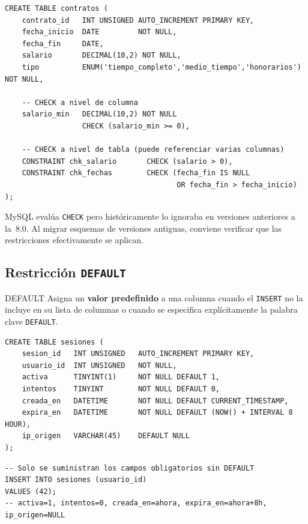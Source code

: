 \begin{lstlisting}[style=sql, caption={CHECK a nivel de columna y de tabla}]
CREATE TABLE contratos (
    contrato_id   INT UNSIGNED AUTO_INCREMENT PRIMARY KEY,
    fecha_inicio  DATE         NOT NULL,
    fecha_fin     DATE,
    salario       DECIMAL(10,2) NOT NULL,
    tipo          ENUM('tiempo_completo','medio_tiempo','honorarios') NOT NULL,

    -- CHECK a nivel de columna
    salario_min   DECIMAL(10,2) NOT NULL
                  CHECK (salario_min >= 0),

    -- CHECK a nivel de tabla (puede referenciar varias columnas)
    CONSTRAINT chk_salario       CHECK (salario > 0),
    CONSTRAINT chk_fechas        CHECK (fecha_fin IS NULL
                                        OR fecha_fin > fecha_inicio)
);
\end{lstlisting}

\begin{nota}
  MySQL evalúa \texttt{CHECK} pero históricamente lo ignoraba en versiones
  anteriores a la~8.0. Al migrar esquemas de versiones antiguas, conviene
  verificar que las restricciones efectivamente se aplican.
\end{nota}

\subsection{Restricción \texttt{DEFAULT}}

\begin{definicion}{DEFAULT}
  Asigna un \textbf{valor predefinido} a una columna cuando el \texttt{INSERT}
  no la incluye en su lista de columnas o cuando se especifica explícitamente
  la palabra clave \texttt{DEFAULT}.
\end{definicion}

\begin{lstlisting}[style=sql, caption={Uso de DEFAULT con distintos tipos}]
CREATE TABLE sesiones (
    sesion_id   INT UNSIGNED   AUTO_INCREMENT PRIMARY KEY,
    usuario_id  INT UNSIGNED   NOT NULL,
    activa      TINYINT(1)     NOT NULL DEFAULT 1,
    intentos    TINYINT        NOT NULL DEFAULT 0,
    creada_en   DATETIME       NOT NULL DEFAULT CURRENT_TIMESTAMP,
    expira_en   DATETIME       NOT NULL DEFAULT (NOW() + INTERVAL 8 HOUR),
    ip_origen   VARCHAR(45)    DEFAULT NULL
);
\end{lstlisting}

\begin{lstlisting}[style=sql, caption={INSERT que aprovecha los DEFAULT definidos}]
-- Solo se suministran los campos obligatorios sin DEFAULT
INSERT INTO sesiones (usuario_id)
VALUES (42);
-- activa=1, intentos=0, creada_en=ahora, expira_en=ahora+8h, ip_origen=NULL
\end{lstlisting}


